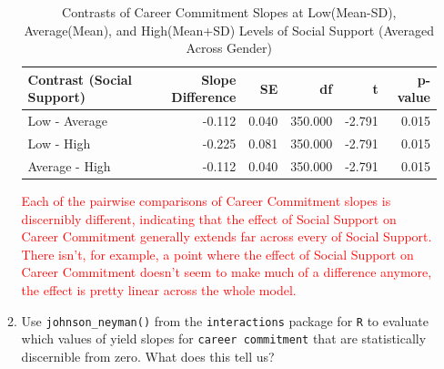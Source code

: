 \documentclass{article}\usepackage[]{graphicx}\usepackage[]{xcolor}
\begin{document}
\begin{enumerate}
\begin{enumerate}
\begin{table}[H]
\centering
\begingroup\normalsize
\begin{tabular}{lrrrrr}
  \hline
Contrast (Social Support) & Slope Difference & SE & df & t & p-value \\ 
  \hline
Low - Average & -0.112 & 0.040 & 350.000 & -2.791 & 0.015 \\ 
  Low - High & -0.225 & 0.081 & 350.000 & -2.791 & 0.015 \\ 
  Average - High & -0.112 & 0.040 & 350.000 & -2.791 & 0.015 \\ 
   \hline
\end{tabular}
\endgroup
\caption{Contrasts of Career Commitment Slopes at 
            Low(Mean-SD), Average(Mean), 
            and High(Mean+SD) Levels of Social Support (Averaged Across Gender)} 
\label{pairs.tab}
\end{table}

    
    
    \textcolor{red}{Each of the pairwise comparisons of Career Commitment slopes is discernibly different, indicating that the effect of Social Support on Career Commitment generally extends far across every of Social Support. There isn't, for example, a point where the effect of Social Support on Career Commitment doesn't seem to make much of a difference anymore, the effect is pretty linear across the whole model.}
    
    \item Use \texttt{johnson\_neyman()} from the \texttt{interactions} package
    for \texttt{R} \citep{interactions} to evaluate which values of 
     yield slopes for  \texttt{career commitment} that
    are statistically discernible from zero. What does this tell us?
    
    \begin{figure}[H]
    \centering
    

\end{figure}
\end{enumerate}
\end{enumerate}
\end{document}
